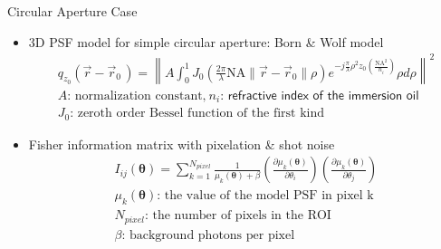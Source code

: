 \documentclass[t]{beamer}
\begin{document}
\begin{frame}{
    Circular Aperture Case
}
    \begin{itemize}
        \item 3D PSF model for simple circular aperture: Born \& Wolf model
            \begin{gather*}
                q_{z_0}(\vec{r}-\vec{r}_0\,)=\left\|A \int_{0}^{1}{J_0\left(\frac{2\pi}{\lambda}\textrm{NA}  \|\vec{r}-\vec{r}_0\| \rho\right)e^{-j\frac{\pi}{\lambda}\rho^2 z_0\left(\frac{\textrm{NA}^2}{n_i}\right) }\rho d\rho} \right\|^2\\
                A\text{: normalization constant,}\: n_i\textsf{: refractive index of the immersion oil}\\
                J_0\text{: zeroth order Bessel function of the first kind}
            \end{gather*}
        \item Fisher information matrix with pixelation \& shot noise 
            \begin{gather*}
                I_{ij}(\boldsymbol{\theta})=\sum_{k=1}^{N_{pixel}}{\frac{1}{\mu_k(\boldsymbol{\theta})+\beta}\left(\frac{\partial \mu_k(\boldsymbol{\theta})}{\partial \theta_i}\right)\left(\frac{\partial \mu_k(\boldsymbol{\theta})}{\partial \theta_j}\right)}\\
                \mu_k(\boldsymbol{\theta})\text{: the value of the model PSF in pixel k}\\
                N_{pixel}\text{: the number of pixels in the ROI}\\
                \beta\text{: background photons per pixel}
            \end{gather*}



    \end{itemize}
\end{frame}
\end{document}
